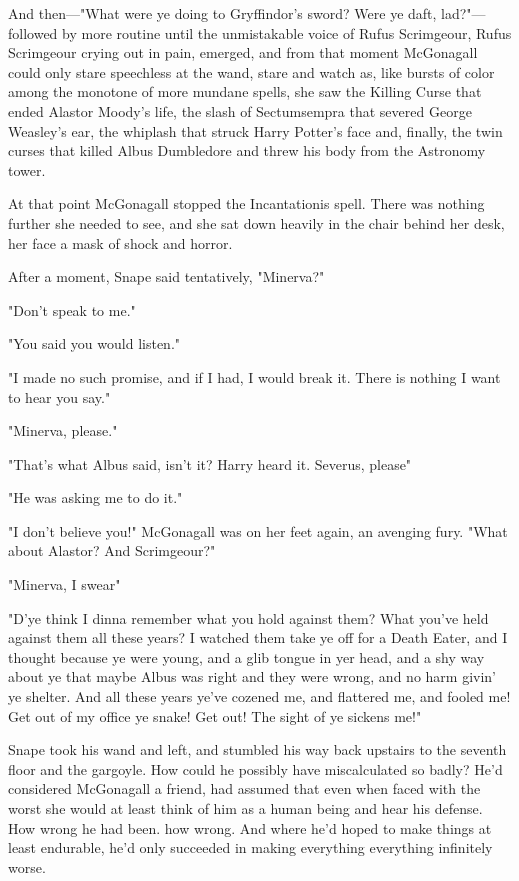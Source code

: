And then—"What were ye doing to Gryffindor's sword? Were ye daft, lad?"—followed by more routine until the unmistakable voice of Rufus Scrimgeour, Rufus Scrimgeour crying out in pain, emerged, and from that moment McGonagall could only stare speechless at the wand, stare and watch as, like bursts of color among the monotone of more mundane spells, she saw the Killing Curse that ended Alastor Moody's life, the slash of Sectumsempra that severed George Weasley's ear, the whiplash that struck Harry Potter's face and, finally, the twin curses that killed Albus Dumbledore and threw his body from the Astronomy tower.

At that point McGonagall stopped the Incantationis spell. There was nothing further she needed to see, and she sat down heavily in the chair behind her desk, her face a mask of shock and horror.

After a moment, Snape said tentatively, "Minerva?"

"Don't speak to me."

"You said you would listen."

"I made no such promise, and if I had, I would break it. There is nothing I want to hear you say."

"Minerva, please."

"That's what Albus said, isn't it? Harry heard it. Severus, please{\el}"

"He was asking me to do it."

"I don't believe you!" McGonagall was on her feet again, an avenging fury. "What about Alastor? And Scrimgeour?"

"Minerva, I swear{\el}"

"D'ye think I dinna remember what you hold against them? What you've held against them all these years? I watched them take ye off for a Death Eater, and I thought because ye were young, and a glib tongue in yer head, and a shy way about ye that maybe Albus was right and they were wrong, and no harm givin' ye shelter. And all these years ye've cozened me, and flattered me, and fooled me! Get out of my office ye snake! Get out! The sight of ye sickens me!"

Snape took his wand and left, and stumbled his way back upstairs to the seventh floor and the gargoyle. How could he possibly have miscalculated so badly? He'd considered McGonagall a friend, had assumed that even when faced with the worst she would at least think of him as a human being and hear his defense. How wrong he had been{\el}. how wrong. And where he'd hoped to make things at least endurable, he'd only succeeded in making everything{\el} everything{\el} infinitely worse.

